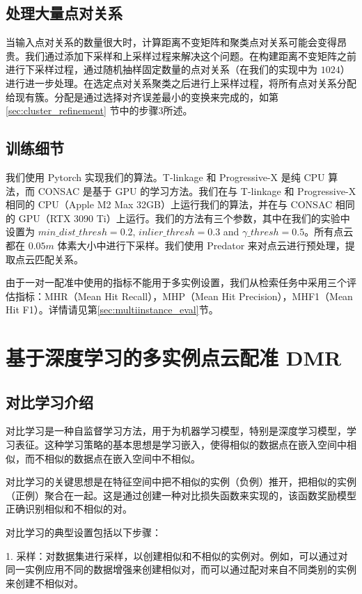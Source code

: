 \subsection{处理大量点对关系}
当输入点对关系的数量很大时，计算距离不变矩阵和聚类点对关系可能会变得昂贵。我们通过添加下采样和上采样过程来解决这个问题。在构建距离不变矩阵之前进行下采样过程，通过随机抽样固定数量的点对关系（在我们的实现中为 $1024$）进行进一步处理。在选定点对关系聚类之后进行上采样过程，将所有点对关系分配给现有簇。分配是通过选择对齐误差最小的变换来完成的，如第 \ref{sec:cluster_refinement} 节中的步骤3所述。

\subsection{训练细节}
我们使用 Pytorch\cite{PyTorch} 实现我们的算法。T-linkage 和 Progressive-X 是纯 CPU 算法，而 CONSAC 是基于 GPU 的学习方法。我们在与 T-linkage 和 Progressive-X 相同的 CPU（Apple M2 Max 32GB）上运行我们的算法，并在与 CONSAC 相同的 GPU（RTX 3090 Ti）上运行。我们的方法有三个参数，其中在我们的实验中设置为 $min\_dist\_thresh=0.2$, $inlier\_thresh=0.3$ and $\gamma\_thresh=0.5$。所有点云都在 $0.05m$ 体素大小中进行下采样。我们使用 Predator \cite{huang2021predator} 来对点云进行预处理，提取点云匹配关系。

由于一对一配准中使用的指标不能用于多实例设置，我们从检索任务中采用三个评估指标：MHR（Mean Hit Recall），MHP（Mean Hit Precision），MHF1（Mean Hit F1）。详情请见第\ref{sec:multiinstance_eval}节。

\section{基于深度学习的多实例点云配准 DMR}
\subsection{对比学习介绍}
对比学习是一种自监督学习方法，用于为机器学习模型，特别是深度学习模型，学习表征。这种学习策略的基本思想是学习嵌入，使得相似的数据点在嵌入空间中相似，而不相似的数据点在嵌入空间中不相似。

对比学习的关键思想是在特征空间中把不相似的实例（负例）推开，把相似的实例（正例）聚合在一起。这是通过创建一种对比损失函数来实现的，该函数奖励模型正确识别相似和不相似的对。

对比学习的典型设置包括以下步骤：

1. 采样：对数据集进行采样，以创建相似和不相似的实例对。例如，可以通过对同一实例应用不同的数据增强来创建相似对，而可以通过配对来自不同类别的实例来创建不相似对。

